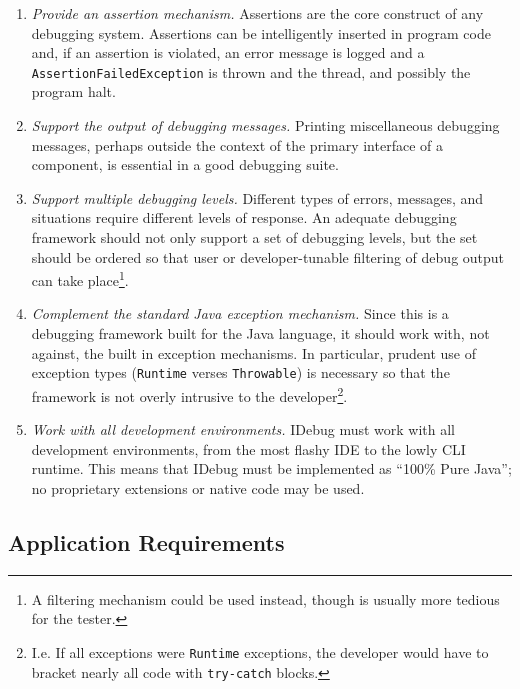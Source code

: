 \documentclass{article}
\begin{document}
\begin{enumerate}
\item \emph{Provide an assertion mechanism.}  Assertions are the core
  construct of any debugging system.  Assertions can be intelligently inserted
  in program code and, if an assertion is violated, an error message is logged
  and a \texttt{AssertionFailedException} is thrown and the thread, and
  possibly the program halt.
\item \emph{Support the output of debugging messages.}  Printing
  miscellaneous debugging messages, perhaps outside the context of the
  primary interface of a component, is essential in a good debugging
  suite.
\item \emph{Support multiple debugging levels.} Different types of
  errors, messages, and situations require different levels of
  response.  An adequate debugging framework should not only support a
  set of debugging levels, but the set should be ordered so that user
  or developer-tunable filtering of debug output can take
  place\footnote{A filtering mechanism could be used instead, though
  is usually more tedious for the tester.}.
\item \emph{Complement the standard Java exception mechanism.} Since
  this is a debugging framework built for the Java language, it should
  work with, not against, the built in exception mechanisms.  In
  particular, prudent use of exception types (\texttt{Runtime} verses
  \texttt{Throwable}) is necessary so that the framework is not overly
  intrusive to the developer\footnote{I.e. If all exceptions were
  \texttt{Runtime} exceptions, the developer would have to bracket
  nearly all code with \texttt{try-catch} blocks.}.
\item \emph{Work with all development environments.}  IDebug must work
  with all development environments, from the most flashy IDE to the
  lowly CLI runtime.  This means that IDebug must be implemented as
  ``100\% Pure Java''; no proprietary extensions or native code may
  be used.
\end{enumerate}

\subsection{Application Requirements}
\end{document}
